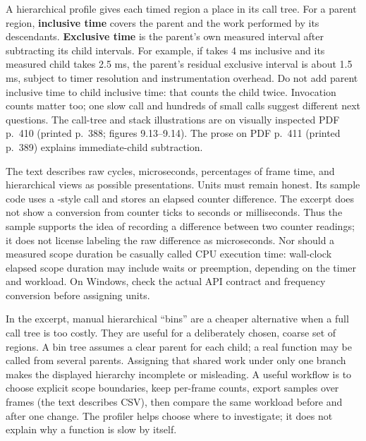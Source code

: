 A hierarchical profile gives each timed region a place in its call tree. For a parent region, \textbf{inclusive time} covers the parent and the work performed by its descendants. \textbf{Exclusive time} is the parent's own measured interval after subtracting its child intervals. For example, if  takes 4 ms inclusive and its measured  child takes 2.5 ms, the parent's residual exclusive interval is about 1.5 ms, subject to timer resolution and instrumentation overhead. Do not add parent inclusive time to child inclusive time: that counts the child twice. Invocation counts matter too; one slow call and hundreds of small calls suggest different next questions. The call-tree and stack illustrations are on visually inspected PDF p.~410 (printed p.~388; figures 9.13--9.14). The prose on PDF p.~411 (printed p.~389) explains immediate-child subtraction.

The text describes raw cycles, microseconds, percentages of frame time, and hierarchical views as possible presentations. Units must remain honest. Its sample  code uses a -style call and stores an elapsed counter difference. The excerpt does not show a conversion from counter ticks to seconds or milliseconds. Thus the sample supports the idea of recording a difference between two counter readings; it does not license labeling the raw difference as microseconds. Nor should a measured scope duration be casually called CPU execution time: wall-clock elapsed scope duration may include waits or preemption, depending on the timer and workload. On Windows, check the actual API contract and frequency conversion before assigning units.

In the excerpt, manual hierarchical ``bins'' are a cheaper alternative when a full call tree is too costly. They are useful for a deliberately chosen, coarse set of regions. A bin tree assumes a clear parent for each child; a real function may be called from several parents. Assigning that shared work under only one branch makes the displayed hierarchy incomplete or misleading. A useful workflow is to choose explicit scope boundaries, keep per-frame counts, export samples over frames (the text describes CSV), then compare the same workload before and after one change. The profiler helps choose where to investigate; it does not explain why a function is slow by itself.

